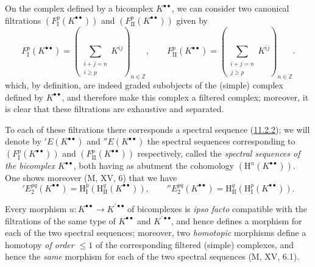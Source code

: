 \begin{env}[11.3.2]
\label{0.11.3.2}
On the complex defined by a bicomplex $K^{\bullet\bullet}$, we can
consider two canonical filtrations
$(F_{\mathrm I}^p(K^{\bullet\bullet}))$ and
$(F_{\mathrm{II}}^p(K^{\bullet\bullet}))$ given by
\[
\label{0.11.3.2.1}
  F_{\mathrm I}^p(K^{\bullet\bullet})
  =\left(\sum_{\substack{i+j=n\\i\geq p}}K^{ij}\right)_{n\in\mathbb Z},
  \qquad
  F_{\mathrm{II}}^p(K^{\bullet\bullet})
  =\left(\sum_{\substack{i+j=n\\j\geq p}}K^{ij}\right)_{n\in\mathbb Z}.
  \tag{11.3.2.1}
\]
which, by definition, are indeed graded subobjects of the (simple) complex
defined by $K^{\bullet\bullet}$, and therefore make this complex a filtered
complex; moreover, it is clear that these filtrations are exhaustive and
separated.

To each of these filtrations there corresponds a spectral sequence
(\hyperref[0.11.2.2]{11.2.2}); we will denote by
$'E(K^{\bullet\bullet})$ and $''E(K^{\bullet\bullet})$ the spectral sequences
corresponding to $(F_{\mathrm I}^p(K^{\bullet\bullet}))$ and
$(F_{\mathrm{II}}^p(K^{\bullet\bullet}))$ respectively, called the
\emph{spectral sequences of the bicomplex $K^{\bullet\bullet}$}, both
having as abutment the cohomology
$(\mathrm H^n(K^{\bullet\bullet}))$. One shows moreover (M, XV, 6) that we have
\[
\label{0.11.3.2.2}
  'E_2^{pq}(K^{\bullet\bullet})
  =\mathrm H_{\mathrm I}^p(\mathrm H_{\mathrm{II}}^q(K^{\bullet\bullet})),
  \qquad
  ''E_2^{pq}(K^{\bullet\bullet})
  =\mathrm H_{\mathrm{II}}^q(\mathrm H_{\mathrm I}^p(K^{\bullet\bullet})).
  \tag{11.3.2.2}
\]

Every morphism $u:K^{\bullet\bullet}\to K^{\prime\bullet\bullet}$ of
bicomplexes is \emph{ipso facto} compatible with the filtrations of the same
type of $K^{\bullet\bullet}$ and $K^{\prime\bullet\bullet}$, and hence defines a
morphism for each of the two spectral sequences; moreover, two
\emph{homotopic} morphisms define a homotopy \emph{of order $\leq1$} of the
corresponding filtered (simple) complexes, and hence the \emph{same} morphism for
each of the two spectral sequences (M, XV, 6.1).
\end{env}

